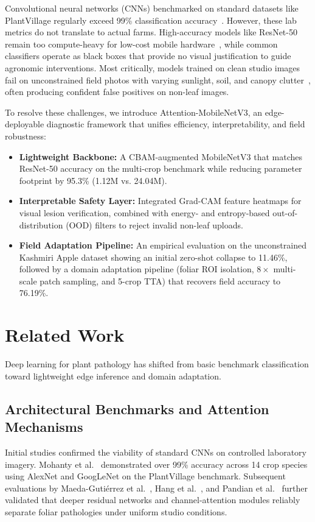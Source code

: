\documentclass[conference]{IEEEtran}
\begin{document}
Convolutional neural networks (CNNs) benchmarked on standard datasets like PlantVillage regularly exceed 99\% classification accuracy~\cite{ref1, ref2, ref3, ref4}. However, these lab metrics do not translate to actual farms. High-accuracy models like ResNet-50 remain too compute-heavy for low-cost mobile hardware~\cite{ref5, ref6}, while common classifiers operate as black boxes that provide no visual justification to guide agronomic interventions. Most critically, models trained on clean studio images fail on unconstrained field photos with varying sunlight, soil, and canopy clutter~\cite{ref7, ref8, ref9}, often producing confident false positives on non-leaf images.

To resolve these challenges, we introduce Attention-MobileNetV3, an edge-deployable diagnostic framework that unifies efficiency, interpretability, and field robustness:
\begin{itemize}
    \item \textbf{Lightweight Backbone:} A CBAM-augmented MobileNetV3 that matches ResNet-50 accuracy on the multi-crop benchmark while reducing parameter footprint by 95.3\% (1.12M vs. 24.04M).
    \item \textbf{Interpretable Safety Layer:} Integrated Grad-CAM feature heatmaps for visual lesion verification, combined with energy- and entropy-based out-of-distribution (OOD) filters to reject invalid non-leaf uploads.
    \item \textbf{Field Adaptation Pipeline:} An empirical evaluation on the unconstrained Kashmiri Apple dataset showing an initial zero-shot collapse to 11.46\%, followed by a domain adaptation pipeline (foliar ROI isolation, $8\times$ multi-scale patch sampling, and 5-crop TTA) that recovers field accuracy to 76.19\%.
\end{itemize}

\section{Related Work}
\label{sec:related_work}

Deep learning for plant pathology has shifted from basic benchmark classification toward lightweight edge inference and domain adaptation.

\subsection{Architectural Benchmarks and Attention Mechanisms}
Initial studies confirmed the viability of standard CNNs on controlled laboratory imagery. Mohanty et al.~\cite{ref1} demonstrated over 99\% accuracy across 14 crop species using AlexNet and GoogLeNet on the PlantVillage benchmark. Subsequent evaluations by Maeda-Guti{\'e}rrez et al.~\cite{ref2}, Hang et al.~\cite{ref3}, and Pandian et al.~\cite{ref4} further validated that deeper residual networks and channel-attention modules reliably separate foliar pathologies under uniform studio conditions. 
\end{document}
